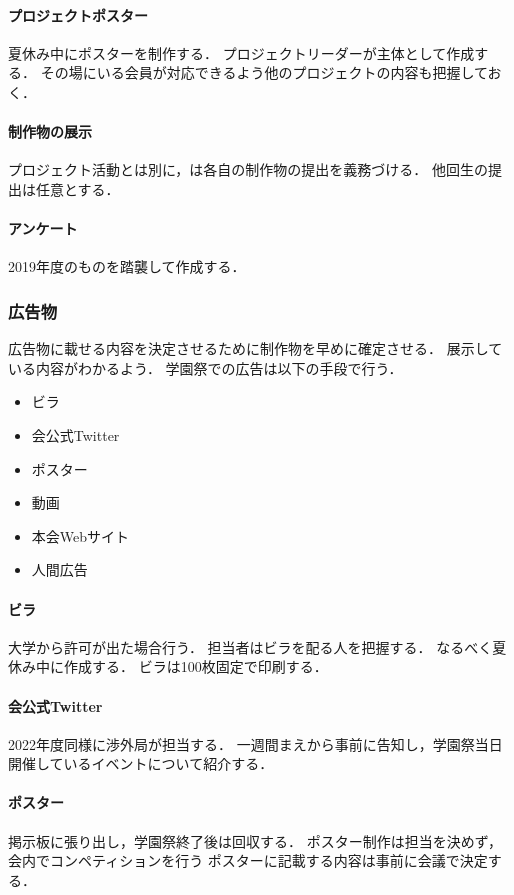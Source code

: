 \paragraph{プロジェクトポスター}
夏休み中にポスターを制作する．
プロジェクトリーダーが主体として作成する．
その場にいる会員が対応できるよう他のプロジェクトの内容も把握しておく．

\paragraph{制作物の展示}
プロジェクト活動とは別に\secondGrade{}，\thirdGrade{}は各自の制作物の提出を義務づける．
他回生の提出は任意とする．

\paragraph{アンケート}
2019年度のものを踏襲して作成する．

\subsubsection*{広告物}
広告物に載せる内容を決定させるために制作物を早めに確定させる．
展示している内容がわかるよう．
学園祭での広告は以下の手段で行う．
\begin{itemize}
    \item ビラ
    \item 会公式Twitter
    \item ポスター
    \item 動画
    \item 本会Webサイト
    \item 人間広告
\end{itemize}

\paragraph{ビラ}
大学から許可が出た場合行う．
担当者はビラを配る人を把握する．
なるべく夏休み中に作成する．
ビラは100枚固定で印刷する．

\paragraph{会公式Twitter}
2022年度同様に渉外局が担当する．
一週間まえから事前に告知し，学園祭当日開催しているイベントについて紹介する．

\paragraph{ポスター}
掲示板に張り出し，学園祭終了後は回収する．
ポスター制作は担当を決めず，会内でコンペティションを行う
ポスターに記載する内容は事前に会議で決定する．

